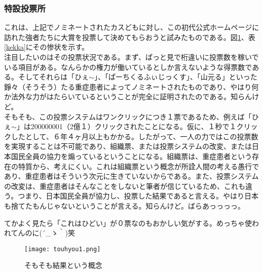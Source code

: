 \subsubsection{特設投票所}
これは、上記でノミネートされたカスどもに対し、この初代公式ホームページに訪れた強者たちに大賞を投票して決めてもらおうと試みたものである。図\ref{touhyou}、表\ref{kekka}にその惨状を示す。\\
注目したいのはその投票状況である。まず、ぱっと見で桁違いに投票数を稼いでいる項目がある。なんらかの権力が働いているとしか言えないような得票数である。そしてそれらは「ひぇ$\sim$」、「ぱーちくるふぃじっくす」、「山元る」といった錚々（そうそう）たる重症患者によってノミネートされたものであり、やはり何か法外な力がはたらいているということが完全に証明されたのである。知らんけど。\\
そもそも、この投票システムはワンクリックにつき１票であるため、例えば「ひぇ$\sim$」は200000001（2億１）クリックされたことになる。仮に、１秒で１クリックしたとして、６年４ヶ月以上もかかる。したがって、一人の力ではこの投票数を実現することは不可能であり、組織票、または投票システムの改変、または日本国民全員の協力を煽っているということになる。組織票は、重症患者という存在の特質から、考えにくい。これは組織票という概念が所詮人間の考える愚行であり、重症患者はそういう次元に生きていないからである。また、投票システムの改変は、重症患者はそんなことをしないと筆者が信じているため、これも違う。つまり、日本国民全員が協力し、投票した結果であると言える。やはり日本も捨てたもんじゃないということが言える。知らんけど。ばらあっっっっ。\par
てかよく見たら「これはひどい」が０票なのもおかしい気がする。めっちゃ使われてんのに\sf (´\_ゝ｀)笑\\


\begin{figure}[H]
  \centering
  \texttt{[image: touhyou1.png]}
  \caption{そもそも結果という概念}
\label{touhyou}
\end{figure}


